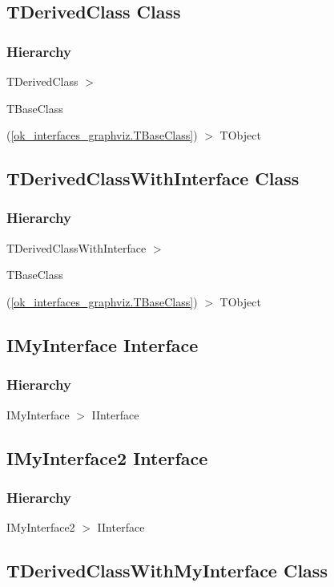 \documentclass{report}
\begin{document}
\subsection*{TDerivedClass Class}
\subsubsection*{\large{\textbf{Hierarchy}}\normalsize\hspace{1ex}\hfill}
TDerivedClass {$>$} \begin{ttfamily}TBaseClass\end{ttfamily}(\ref{ok_interfaces_graphviz.TBaseClass}) {$>$} 
TObject
\subsection*{TDerivedClassWithInterface Class}
\subsubsection*{\large{\textbf{Hierarchy}}\normalsize\hspace{1ex}\hfill}
TDerivedClassWithInterface {$>$} \begin{ttfamily}TBaseClass\end{ttfamily}(\ref{ok_interfaces_graphviz.TBaseClass}) {$>$} 
TObject
\subsection*{IMyInterface Interface}
\subsubsection*{\large{\textbf{Hierarchy}}\normalsize\hspace{1ex}\hfill}
IMyInterface {$>$} IInterface
\subsection*{IMyInterface2 Interface}
\subsubsection*{\large{\textbf{Hierarchy}}\normalsize\hspace{1ex}\hfill}
IMyInterface2 {$>$} IInterface
\subsection*{TDerivedClassWithMyInterface Class}
\end{document}
